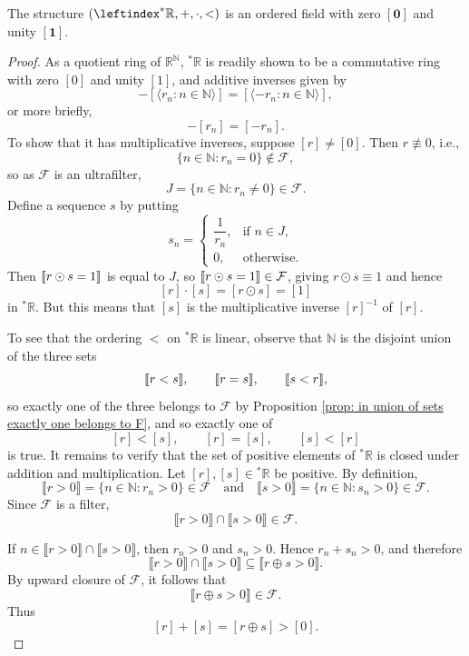 \begin{thm} 
    The structure $(\leftindex^* {\R}, +, \cdot, <)$ is an ordered field with zero $[\mathbf{0}]$ and unity $[\mathbf{1}]$. 
\end{thm}
\begin{proof}
As a quotient ring of $\mathbb{R}^{\mathbb{N}}$, ${}^{*}\mathbb{R}$ is readily shown to be a commutative ring with zero $[0]$ and unity $[1]$, and additive inverses given by
\[
-[\langle r_n : n \in \mathbb{N}\rangle] 
=
 [\langle-r_n : n \in \mathbb{N}\rangle],
\]
or more briefly,
\[
-[r_n]=[-r_n].
\]
To show that it has multiplicative inverses, suppose $[r]\neq[0]$. Then $r\not\equiv 0$, i.e.,
\[
\{n\in\mathbb{N}:r_n=0\}\notin\mathcal{F},
\]
so as $\mathcal{F}$ is an ultrafilter,
\[
J=\{n\in\mathbb{N}:r_n\neq 0\}\in\mathcal{F}.
\]
Define a sequence $s$ by putting
\[
s_n=
\begin{cases}
\dfrac{1}{r_n}, & \text{if } n\in J,\\[4pt]
0, & \text{otherwise}.
\end{cases}
\]
Then $\llbracket r\odot s=1 \rrbracket$ is equal to $J$, so $\llbracket r\odot s=1 \rrbracket \in\mathcal{F}$, giving $r\odot s\equiv 1$ and hence
\[
[r]\cdot[s]=[r\odot s]=[1]
\]
in ${}^{*}\mathbb{R}$. But this means that $[s]$ is the multiplicative inverse $[r]^{-1}$ of $[r]$.

To see that the ordering $<$ on ${}^{*}\mathbb{R}$ is linear, observe that $\mathbb{N}$ is the disjoint union of the three sets
\[
\llbracket r<s \rrbracket,\qquad \llbracket r=s\rrbracket,\qquad \llbracket s<r \rrbracket,
\]
so exactly one of the three belongs to $\mathcal{F}$ by Proposition \ref{prop: in union of sets exactly one belongs to F}, and so exactly one of
\[
[r]<[s],\qquad [r]=[s],\qquad [s]<[r]
\]
is true. It remains to verify that the set of positive elements of ${}^*\mathbb{R}$
is closed under addition and multiplication. Let $[r],[s]\in{}^*\mathbb{R}$
be positive. By definition,
\[
\llbracket r>0\rrbracket
=\{n\in\mathbb{N}:r_n>0\}\in\mathcal{F}
\quad\text{and}\quad
\llbracket s>0\rrbracket
=\{n\in\mathbb{N}:s_n>0\}\in\mathcal{F}.
\]
Since $\mathcal{F}$ is a filter,
\[
\llbracket r>0\rrbracket\cap\llbracket s>0\rrbracket\in\mathcal{F}.
\]

If $n\in\llbracket r>0\rrbracket\cap\llbracket s>0\rrbracket$,
then $r_n>0$ and $s_n>0$. Hence $r_n+s_n>0$, and therefore
\[
\llbracket r>0\rrbracket\cap\llbracket s>0\rrbracket
\subseteq
\llbracket r\oplus s>0\rrbracket.
\]
By upward closure of $\mathcal{F}$, it follows that
\[
\llbracket r\oplus s>0\rrbracket\in\mathcal{F}.
\]
Thus
\[
[r]+[s]=[r\oplus s]>[0].
\]


\end{proof}
